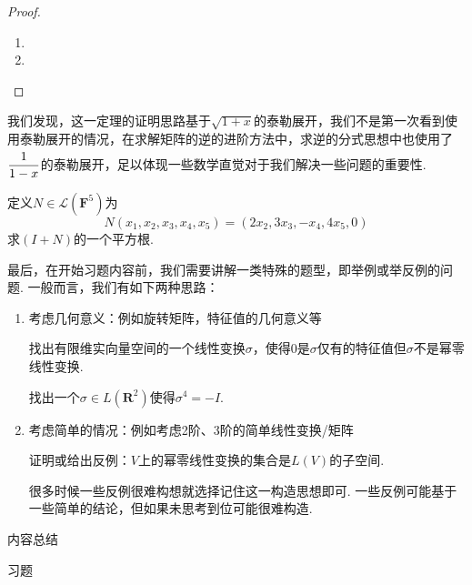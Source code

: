 \begin{proof}
    \begin{enumerate}
        \item

        \item
    \end{enumerate}
\end{proof}

我们发现，这一定理的证明思路基于$\sqrt{1+x}$的泰勒展开，我们不是第一次看到使用泰勒展开的情况，在求解矩阵的逆的进阶方法中，求逆的分式思想中也使用了 $\vphantom{\cfrac{1}{1-x}}\dfrac{1}{1-x}$的泰勒展开，足以体现一些数学直觉对于我们解决一些问题的重要性.

\begin{example}
    定义$N\in \mathcal{L}(\mathbf{F}^5)$为
    \[N(x_1,x_2,x_3,x_4,x_5)=(2x_2,3x_3,-x_4,4x_5,0)\]
    求$(I+N)$的一个平方根.
\end{example}

\begin{solution}

\end{solution}

最后，在开始习题内容前，我们需要讲解一类特殊的题型，即举例或举反例的问题. 一般而言，我们有如下两种思路：
\begin{enumerate}
    \item 考虑几何意义：例如旋转矩阵，特征值的几何意义等
          \begin{example}
              找出有限维实向量空间的一个线性变换$\sigma$，使得0是$\sigma$仅有的特征值但$\sigma$不是幂零线性变换.
          \end{example}
          \begin{example}
              找出一个$\sigma\in L(\mathbf{R}^2)$使得$\sigma^4=-I$.
          \end{example}

    \item 考虑简单的情况：例如考虑2阶、3阶的简单线性变换/矩阵
          \begin{example}
              证明或给出反例：$V$上的幂零线性变换的集合是$L(V)$的子空间.
          \end{example}
          很多时候一些反例很难构想就选择记住这一构造思想即可. 一些反例可能基于一些简单的结论，但如果未思考到位可能很难构造.
\end{enumerate}

\vspace{2ex}
\centerline{\heiti \Large 内容总结}

\vspace{2ex}
\centerline{\heiti \Large 习题}

